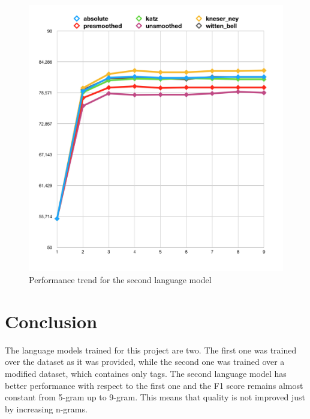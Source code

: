 \documentclass[11pt,a4paper]{article}
\begin{document}
\begin{figure}[ht]
  \includegraphics[width=\linewidth]{img/results-o.png}
  \caption{Performance trend for the second language model}
  \label{fig:performance2}
\end{figure}

\section{Conclusion}
The language models trained for this project are two. The first one was trained over the dataset as it was provided, while the second one was trained over a modified dataset, which containes only tags. The second language model has better performance with respect to the first one and the F1 score remains almost constant from 5-gram up to 9-gram. This means that quality is not improved just by increasing n-grams.
\end{document}
